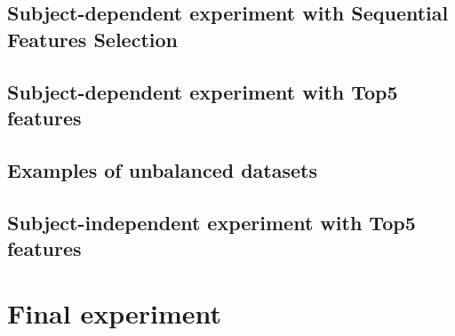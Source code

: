 \subsection{Subject-dependent experiment with Sequential Features Selection}
\label{sec:appendix_A3.1}

\subsection{Subject-dependent experiment with Top5 features}
\label{sec:appendix_A3.2}

\subsection{Examples of unbalanced datasets}
\label{sec:appendix_A3.3}

\subsection{Subject-independent experiment with Top5 features}
\label{sec:appendix_A3.4}


\section{Final experiment}
\label{sec:appendix_A4}



